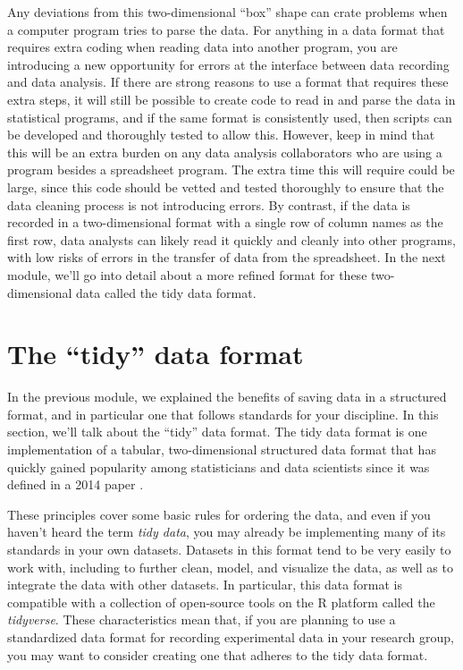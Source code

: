 \documentclass[]{tufte-book}
\begin{document}
Any deviations from this two-dimensional ``box'' shape can crate problems when a
computer program tries to parse the data. For anything in a data format that
requires extra coding when reading data into another program, you are
introducing a new opportunity for errors at the interface between data recording
and data analysis. If there are strong reasons to use a format that requires
these extra steps, it will still be possible to create code to read in and parse
the data in statistical programs, and if the same format is consistently used,
then scripts can be developed and thoroughly tested to allow this. However, keep
in mind that this will be an extra burden on any data analysis collaborators who
are using a program besides a spreadsheet program. The extra time this will
require could be large, since this code should be vetted and tested thoroughly
to ensure that the data cleaning process is not introducing errors. By contrast,
if the data is recorded in a two-dimensional format with a single row of column
names as the first row, data analysts can likely read it quickly and cleanly
into other programs, with low risks of errors in the transfer of data from the
spreadsheet. In the next module, we'll go into detail about a more refined
format for these two-dimensional data called the tidy data format.

\section{The ``tidy'' data format}\label{module3}

In the previous module, we explained the benefits of saving data in a structured
format, and in particular one that follows standards for your discipline. In
this section, we'll talk about the ``tidy'' data format. The tidy data format is
one implementation of a tabular, two-dimensional structured data format that has
quickly gained popularity among statisticians and data scientists since it was
defined in a 2014 paper \citep{wickham2014tidy}.

These principles cover some basic rules for ordering the data, and even if you
haven't heard the term \emph{tidy data}, you may already be implementing many of its
standards in your own datasets. Datasets in this format tend to be very easily
to work with, including to further clean, model, and visualize the data, as well
as to integrate the data with other datasets. In particular, this data format is
compatible with a collection of open-source tools on the R platform called the
\emph{tidyverse}. These characteristics mean that, if you are planning to use a
standardized data format for recording experimental data in your research group,
you may want to consider creating one that adheres to the tidy data format.
\end{document}

